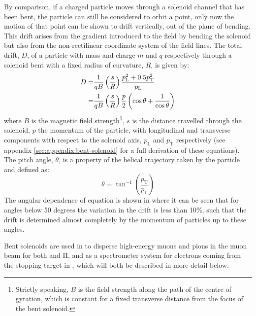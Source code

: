 By comparison, if a charged particle moves through a solenoid channel that has been bent, the particle can still be considered to orbit a point, only now 
the motion of that point can be shown to drift vertically, out of the plane of bending.  This drift arises from the gradient introduced to the field by bending the solenoid but also from the 
non-rectilinear coordinate system of the field lines.  
The total drift, $D$, of a particle with mass and charge $m$ and $q$ respectively  through a solenoid bent with a fixed radius of curvature, $R$, is given by:
\begin{align}
	D=&\frac{1}{qB}\left(\frac{s}{R}\right)\frac{p^2_\mathrm{L}+0.5p^2_\mathrm{T}}{p_\mathrm{L}}\eqlabel{detector:bent-solenoids:longVstrans}\\
	 =&\frac{1}{qB}\left(\frac{s}{R}\right)\frac{p}{2}\left(\cos\theta + \frac{1}{\cos\theta}\right)\eqlabel{detector:bent-solenoids:pitchAngle}
\end{align}
where $B$ is the magnetic field strength\footnote{Strictly speaking, $B$ is the field strength along the path of the centre of gyration, which is constant for a fixed transverse distance from the focus of the bent solenoid.},
$s$ is the distance travelled through the solenoid, $p$ the momentum of the particle, with longitudinal and transverse components with respect to the solenoid axis, $p_\mathrm{L}$ and $p_\mathrm{T}$ respectively
(see appendix \ref{sec:appendix:bent-solenoid} for a full derivation of these equations). %
The pitch angle, $\theta$, is a property of the helical trajectory taken by the particle and defined as:
\begin{equation}
\theta=\tan^{-1}\left(\frac{p_\mathrm{T}}{p_\mathrm{L}}\right)
\end{equation}
The angular dependence of equation  is shown in
 where it can be seen that for
angles below 50 degrees the variation in the drift is less than 10\%, such that
the drift is determined almost completely by the momentum of particles up to
these angles.

Bent solenoids are used in \COMET to disperse high-energy muons and pions in the muon
beam for both \phaseI and II, and as a spectrometer system for electrons coming
from the stopping target in \phaseII, which will both be described in more
detail below.

